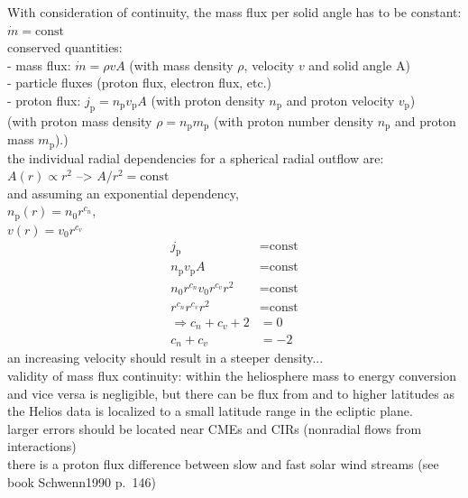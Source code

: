 
With consideration of continuity, the mass flux per solid angle has to be constant: $\dot{m} = \text{const}$\\
conserved quantities:\\
- mass flux: $\dot{m} = \rho v A$ (with mass density $\rho$, velocity $v$ and solid angle A)\\
- particle fluxes (proton flux, electron flux, etc.)\\
	- proton flux: $j_\text{p} = n_\text{p} v_\text{p} A$ (with proton density $n_\text{p}$ and proton velocity $v_\text{p}$)\\

(with proton mass density $\rho = n_\text{p} m_\text{p}$ (with proton number density $n_\text{p}$ and proton mass $m_\text{p}$).)\\

the individual radial dependencies for a spherical radial outflow are:\\
$A(r) \propto r^2$ --> $A/r^2 = \text{const}$\\
and assuming an exponential dependency,\\
$n_{\text{p}}(r) = n_0 r^{c_n}$,\\
$v(r) = v_0 r^{c_v}$\\
\begin{align}
	j_\text{p} &= \text{const}\\
	n_\text{p} v_\text{p} A &= \text{const}\\
	n_0 r^{c_n} v_0 r^{c_v} r^2 &= \text{const}\\
	r^{c_n} r^{c_v} r^2 &= \text{const}\\
	\Rightarrow c_n + c_v + 2 &= 0\\
	c_n + c_v &= -2
\end{align}
an increasing velocity should result in a steeper density...\\

validity of mass flux continuity: within the heliosphere mass to energy conversion and vice versa is negligible, but there can be flux from and to higher latitudes as the Helios data is localized to a small latitude range in the ecliptic plane.\\
larger errors should be located near CMEs and CIRs (nonradial flows from interactions)\\
there is a proton flux difference between slow and fast solar wind streams (see book Schwenn1990 p.~146)

